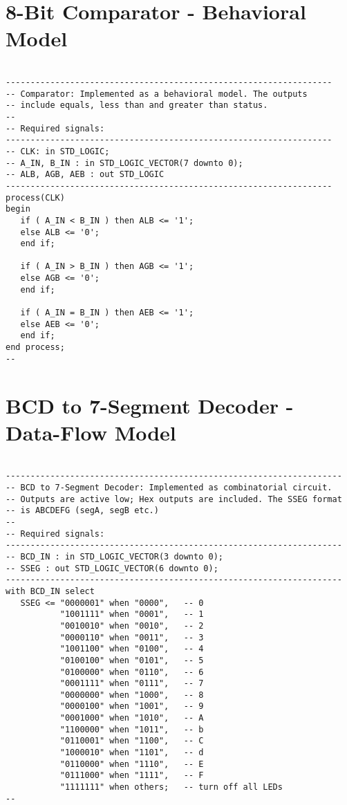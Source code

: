 \section{8-Bit Comparator - Behavioral Model}

\noindent
\begin{minipage}{0.99\linewidth}
\begin{lstlisting}

------------------------------------------------------------------
-- Comparator: Implemented as a behavioral model. The outputs 
-- include equals, less than and greater than status.  
-- 
-- Required signals: 
------------------------------------------------------------------
-- CLK: in STD_LOGIC;
-- A_IN, B_IN : in STD_LOGIC_VECTOR(7 downto 0);
-- ALB, AGB, AEB : out STD_LOGIC
------------------------------------------------------------------
process(CLK)
begin
   if ( A_IN < B_IN ) then ALB <= '1';
   else ALB <= '0';
   end if;
    
   if ( A_IN > B_IN ) then AGB <= '1';
   else AGB <= '0';
   end if;
    
   if ( A_IN = B_IN ) then AEB <= '1';
   else AEB <= '0';
   end if;    
end process;
--
\end{lstlisting}
\end{minipage}

\section{BCD to 7-Segment Decoder - Data-Flow Model}

\noindent
\begin{minipage}{0.99\linewidth}
\begin{lstlisting}

--------------------------------------------------------------------
-- BCD to 7-Segment Decoder: Implemented as combinatorial circuit.  
-- Outputs are active low; Hex outputs are included. The SSEG format
-- is ABCDEFG (segA, segB etc.)
--
-- Required signals: 
--------------------------------------------------------------------
-- BCD_IN : in STD_LOGIC_VECTOR(3 downto 0);
-- SSEG : out STD_LOGIC_VECTOR(6 downto 0); 
--------------------------------------------------------------------
with BCD_IN select
   SSEG <= "0000001" when "0000",   -- 0
           "1001111" when "0001",   -- 1
           "0010010" when "0010",   -- 2
           "0000110" when "0011",   -- 3
           "1001100" when "0100",   -- 4
           "0100100" when "0101",   -- 5
           "0100000" when "0110",   -- 6
           "0001111" when "0111",   -- 7
           "0000000" when "1000",   -- 8
           "0000100" when "1001",   -- 9
           "0001000" when "1010",   -- A
           "1100000" when "1011",   -- b
           "0110001" when "1100",   -- C
           "1000010" when "1101",   -- d
           "0110000" when "1110",   -- E
           "0111000" when "1111",   -- F
           "1111111" when others;   -- turn off all LEDs
--
\end{lstlisting}
\end{minipage}

